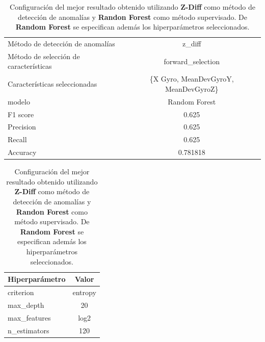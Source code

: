\begin{appendices}
		\begin{table}[htb]
			\centering
			\caption{Configuración del mejor resultado obtenido utilizando \textbf{Z-Diff} como método de detección de anomalías y \textbf{Randon Forest}
			como método supervisado. De \textbf{Random Forest} se especifican además los hiperparámetros seleccionados.}
			\label{table:34}
			\begin{tabular}{lc}
				\toprule
				      Método de detección de anomalías &                               z\_diff \\
				Método de selección de características &                    forward\_selection \\
				         Características seleccionadas & \{X Gyro, MeanDevGyroY, MeanDevGyroZ\} \\
				                                modelo &                        Random Forest \\
				                              F1 score &                                0.625 \\
				                             Precision &                                0.625 \\
				                                Recall &                                0.625 \\
				                              Accuracy &                             0.781818 \\
				\bottomrule
			\end{tabular}
			\newline
			\newline

			\begin{tabular}{lc}
				\toprule
				Hiperparámetro &   Valor \\
				\midrule
					 criterion & entropy \\
					 max\_depth &      20 \\
				  max\_features &    log2 \\
				  n\_estimators &     120 \\
				\bottomrule
			\end{tabular}
			

		\end{table}


\end{appendices}
